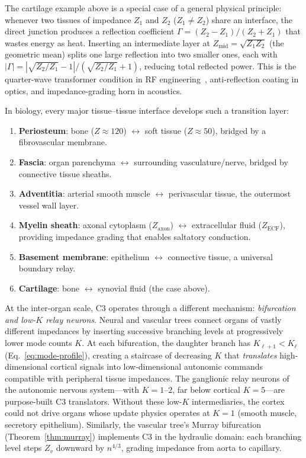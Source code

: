 \documentclass[aps,pre,twocolumn,superscriptaddress,floatfix]{revtex4-2}
\begin{document}
\begin{remark}
\label{rem:c3-relay}
The cartilage example above is a special case of a
general physical principle: whenever two tissues of
impedance $Z_1$ and $Z_2$ ($Z_1 \neq Z_2$) share an
interface, the direct junction produces a reflection
coefficient $\Gamma = (Z_2 - Z_1)/(Z_2 + Z_1)$ that
wastes energy as heat.
Inserting an intermediate layer at
$Z_{\text{mid}} = \sqrt{Z_1 Z_2}$ (the geometric mean)
splits one large reflection into two smaller ones,
each with $|\Gamma| = |\sqrt{Z_2/Z_1} - 1|/
(\sqrt{Z_2/Z_1} + 1)$, reducing total reflected power.
This is the quarter-wave transformer condition in
RF engineering~\cite{Pozar2011}, anti-reflection coating
in optics, and impedance-grading horn in acoustics.

In biology, every major tissue--tissue interface
develops such a transition layer:
\begin{enumerate}
  \item \textbf{Periosteum}: bone ($Z \approx 120$)
    $\leftrightarrow$ soft tissue ($Z \approx 50$),
    bridged by a fibrovascular membrane.
  \item \textbf{Fascia}: organ parenchyma
    $\leftrightarrow$ surrounding vasculature/nerve,
    bridged by connective tissue sheaths.
  \item \textbf{Adventitia}: arterial smooth muscle
    $\leftrightarrow$ perivascular tissue,
    the outermost vessel wall layer.
  \item \textbf{Myelin sheath}: axonal cytoplasm
    ($Z_{\text{axon}}$) $\leftrightarrow$ extracellular
    fluid ($Z_{\text{ECF}}$), providing impedance
    grading that enables saltatory conduction.
  \item \textbf{Basement membrane}: epithelium
    $\leftrightarrow$ connective tissue,
    a universal boundary relay.
  \item \textbf{Cartilage}: bone $\leftrightarrow$
    synovial fluid (the case above).
\end{enumerate}

At the inter-organ scale, C3 operates through a
different mechanism: \emph{bifurcation and low-$K$
relay neurons}.
Neural and vascular trees connect organs of vastly
different impedances by inserting successive branching
levels at progressively lower mode counts $K$.
At each bifurcation, the daughter branch has
$K_{\ell+1} < K_\ell$ (Eq.~\ref{eq:mode-profile}),
creating a staircase of decreasing $K$ that
\emph{translates} high-dimensional cortical signals
into low-dimensional autonomic commands compatible
with peripheral tissue impedances.
The ganglionic relay neurons of the autonomic nervous
system---with $K = 1$--$2$, far below cortical
$K = 5$---are purpose-built C3 translators.
Without these low-$K$ intermediaries, the cortex
could not drive organs whose update physics operates
at $K = 1$ (smooth muscle, secretory epithelium).
Similarly, the vascular tree's Murray bifurcation
(Theorem~\ref{thm:murray}) implements C3 in the
hydraulic domain: each branching level steps
$Z_v$ downward by $n^{4/3}$, grading impedance
from aorta to capillary.


\end{remark}
\end{document}
